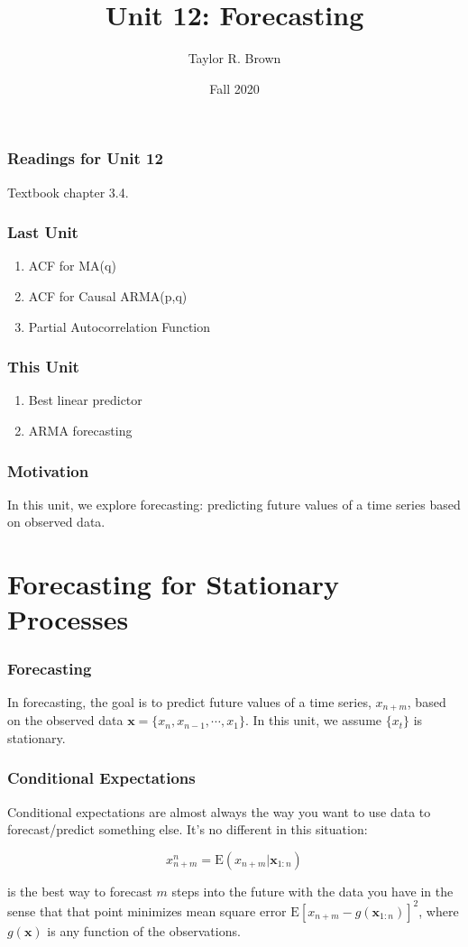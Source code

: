\documentclass[%
xcolor=pdftex]{beamer}
\title{Unit 12: Forecasting}
\author[STAT 5170: Applied Time Series, Unit 12]{Taylor R. Brown}
\institute{Department of Statistics, University of Virginia}
\date{Fall 2020}
\begin{document}
\frame{\titlepage}


\begin{frame}
\frametitle{Readings for Unit 12}


Textbook chapter 3.4.

\end{frame}



\begin{frame}
\frametitle{Last Unit}
\begin{enumerate}
\item ACF for MA(q)
\item ACF for Causal ARMA(p,q)
\item Partial Autocorrelation Function
\end{enumerate}
\end{frame}

\begin{frame}
\frametitle{This Unit}
\begin{enumerate}
\item Best linear predictor
\item ARMA forecasting
\end{enumerate}
\end{frame}


\begin{frame}
\frametitle{Motivation}

In this unit, we explore forecasting: predicting future values of a time series based on observed data.

\end{frame}

\section{Forecasting for Stationary Processes}
\frame{\tableofcontents[currentsection]}

\begin{frame}
\frametitle{Forecasting}

In forecasting, the goal is to predict future values of a time series, $x_{n+m}$, based on the observed data $\mathbf{x} = \{x_n, x_{n-1}, \cdots, x_1 \}$. In this unit, we assume $\{x_t\}$ is stationary.

\end{frame}

\begin{frame}
\frametitle{Conditional Expectations}

Conditional expectations are almost always the way you want to use data to forecast/predict something else. It's no different in this situation:

\begin{equation}
x_{n+m}^n = \mbox{E}(x_{n+m} | \mathbf{x}_{1:n})
\end{equation}

is the best way to forecast $m$ steps into the future with the data you have in the sense that that point minimizes mean square error $\mbox{E}\left[x_{n+m} - g(\mathbf{x}_{1:n}) \right]^2$, where $g(\mathbf{x})$ is any function of the observations.

\end{frame}
\end{document}
